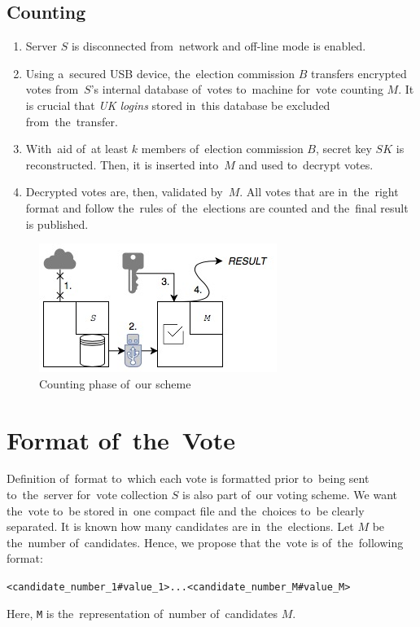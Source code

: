 \subsection{Counting}
\begin{enumerate}
\item Server $S$ is disconnected from~network and off-line mode is enabled.
\item Using a~secured USB device, the~election commission $B$ transfers encrypted votes from~$S$'s internal database of~votes to~machine for~vote counting $M$. It is crucial that \emph{UK logins} stored in~this database be excluded from~the~transfer.
\item With~aid of~at least $k$ members of~election commission $B$, secret key $SK$ is reconstructed. Then, it is inserted into~$M$ and used to~decrypt votes.
\item Decrypted votes are, then, validated by~$M$. All votes that are in~the~right format and follow the~rules of~the~elections are counted and the~final result is published.
\end{enumerate}

\begin{figure}
\begin{center}
\includegraphics[scale=0.9]{images/Counting1}
\caption{Counting phase of~our scheme}
\end{center}
\end{figure}

\section{Format of~the~Vote}
\label{sek:format}
Definition of~format to~which each vote is formatted prior to~being sent to~the~server for~vote collection $S$ is also part of~our voting scheme. We want the~vote to~be stored in~one compact file and the~choices to~be clearly separated. It is known how many candidates are in~the~elections. Let $M$ be the~number of~candidates. Hence, we propose that the~vote is of~the~following format:
\begin{center}
\texttt{<candidate\_number\_1\#value\_1>...<candidate\_number\_M\#value\_M>}
\end{center}
Here, \texttt{M} is the~representation of~number of~candidates $M$.

